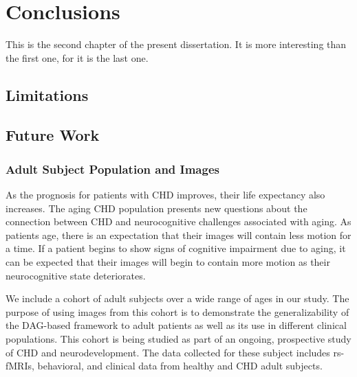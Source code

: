 \chapter{Conclusions}
\label{ch:fin}
This is the second chapter of the present dissertation. It is more interesting than the first one, for it is the last one.

\section{Limitations}

\section{Future Work}

\subsection{Adult Subject Population and Images}

As the prognosis for patients with CHD improves, their life expectancy also increases. The aging CHD population presents new questions about the connection between CHD and neurocognitive challenges associated with aging. As patients age, there is an expectation that their images will contain less motion for a time. If a patient begins to show signs of cognitive impairment due to aging, it can be expected that their images will begin to contain more motion as their neurocognitive state deteriorates. 

We include a cohort of adult subjects over a wide range of ages in our study. The purpose of using images from this cohort is to demonstrate the generalizability of the DAG-based framework to adult patients as well as its use in different clinical populations. This cohort is being studied as part of an ongoing, prospective study of CHD and neurodevelopment. The data collected for these subject includes rs-fMRIs, behavioral, and clinical data from healthy and CHD adult subjects. 
